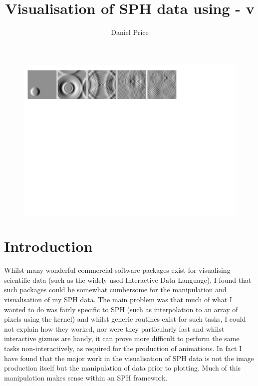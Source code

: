 \documentclass[a4paper,10pt]{article}
\title{Visualisation of SPH data using \splash - v}
\author{Daniel Price}
\begin{document}

\begin{figure}
\begin{center}
\includegraphics[width=\textwidth]{hyperbolic.pdf}
\end{center}
\end{figure}
\maketitle
\tableofcontents%
\newpage

\section{Introduction}%
 Whilst many wonderful commercial software packages exist for visualising scientific
data (such as the widely used Interactive Data Language), I found that such packages
could be somewhat cumbersome for the manipulation and visualisation of my SPH data. The
main problem was that much of what I wanted to do was fairly specific to SPH (such as
interpolation to an array of pixels using the kernel) and whilst generic routines exist
for such tasks, I could not explain how they worked, nor were they
particularly fast and whilst interactive gizmos are handy, it can prove more difficult to perform the
same tasks non-interactively, as required for the production of animations. 
In fact I have found that the major work in the visualisation of SPH data is not the image production itself but the
manipulation of data prior to plotting. Much of this manipulation makes sense
within an SPH framework.
\end{document}
